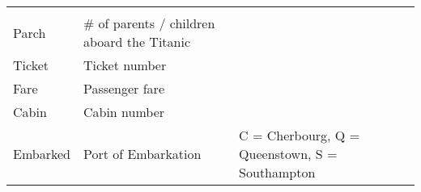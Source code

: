 \documentclass[11pt]{article}
\begin{document}
\begin{longtable}[]{@{}lll@{}}
\begin{minipage}[t]{0.11\columnwidth}
\strut
\end{minipage}\tabularnewline
\begin{minipage}[t]{0.11\columnwidth}\raggedright\strut
Parch\strut
\end{minipage} & \begin{minipage}[t]{0.11\columnwidth}\raggedright\strut
\# of parents / children aboard the Titanic\strut
\end{minipage} & \begin{minipage}[t]{0.11\columnwidth}\raggedright\strut
\strut
\end{minipage}\tabularnewline
\begin{minipage}[t]{0.11\columnwidth}\raggedright\strut
Ticket\strut
\end{minipage} & \begin{minipage}[t]{0.11\columnwidth}\raggedright\strut
Ticket number\strut
\end{minipage} & \begin{minipage}[t]{0.11\columnwidth}\raggedright\strut
\strut
\end{minipage}\tabularnewline
\begin{minipage}[t]{0.11\columnwidth}\raggedright\strut
Fare\strut
\end{minipage} & \begin{minipage}[t]{0.11\columnwidth}\raggedright\strut
Passenger fare\strut
\end{minipage} & \begin{minipage}[t]{0.11\columnwidth}\raggedright\strut
\strut
\end{minipage}\tabularnewline
\begin{minipage}[t]{0.11\columnwidth}\raggedright\strut
Cabin\strut
\end{minipage} & \begin{minipage}[t]{0.11\columnwidth}\raggedright\strut
Cabin number\strut
\end{minipage} & \begin{minipage}[t]{0.11\columnwidth}\raggedright\strut
\strut
\end{minipage}\tabularnewline
\begin{minipage}[t]{0.11\columnwidth}\raggedright\strut
Embarked\strut
\end{minipage} & \begin{minipage}[t]{0.11\columnwidth}\raggedright\strut
Port of Embarkation\strut
\end{minipage} & \begin{minipage}[t]{0.11\columnwidth}\raggedright\strut
C = Cherbourg, Q = Queenstown, S = Southampton\strut
\end{minipage}\tabularnewline
\bottomrule
\end{longtable}
\end{document}
